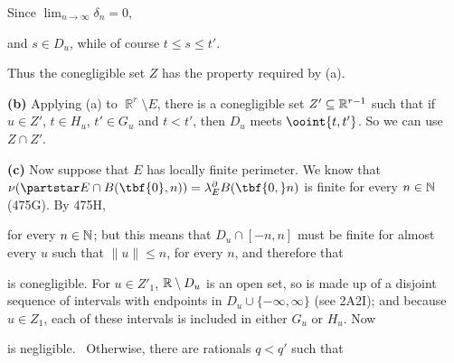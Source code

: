 {


\noindent Since $\lim_{n\to\infty}\delta_n=0$,


\noindent and $s\in D_u$, while of course $t\le s\le t'$.\ \Bang\Qed

\medskip

 Thus the conegligible set $Z$ has the property required
by (a).

\medskip

{\bf (b)} Applying
(a) to $\BbbR^r\setminus E$, there is a conegligible set
$Z'\subseteq\Bbb R^{r-1}$ such that if $u\in Z'$, $t\in H_u$,
$t'\in G_u$ and $t<t'$, then $D_u$ meets $\ooint{t,t'}$.
So we can use $Z\cap Z'$.

\medskip

{\bf (c)} Now suppose that $E$ has locally finite perimeter.
We know that
$\nu(\partstar E\cap B(\tbf{0},n))=\lambda^{\partial}_EB(\tbf{0,}n)$ is
finite for every $n\in\Bbb N$ (475G).   By 475H,


\noindent for every $n\in\Bbb N$;  but this means that $D_u\cap[-n,n]$
must be finite for almost every $u$ such that $\|u\|\le n$, for every
$n$, and therefore that


\noindent is conegligible.   For $u\in Z'_1$, $\Bbb R\setminus D_u$ is an
open set, so is made up of a disjoint sequence of intervals with
endpoints in $D_u\cup\{-\infty,\infty\}$ (see 2A2I);  and because
$u\in Z_1$, each of these intervals is included in either $G_u$ or
$H_u$.   Now


\noindent is negligible.   \Prf\Quer\ Otherwise, there are rationals
$q<q'$ such that


}
